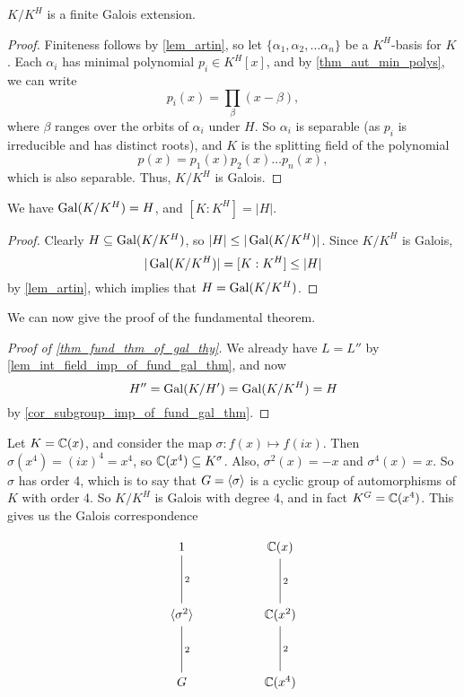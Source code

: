 \begin{corollary}
\label{cor_fixed_field_ext_is_gal}
    $K/K^H$ is a finite Galois extension.
\end{corollary}

\begin{proof}
    Finiteness follows by \cref{lem_artin}, so let $\{\alpha_1, \alpha_2, \ldots \alpha_n\}$ be a $K^H$-basis for $K$. Each $\alpha_i$ has minimal polynomial $p_i \in K^H[x]$, and by \cref{thm_aut_min_polys}, we can write
    \[
        p_i(x) = \prod_{\beta} (x - \beta),
    \]
    where $\beta$ ranges over the orbits of $\alpha_i$ under $H$. So $\alpha_i$ is separable (as $p_i$ is irreducible and has distinct roots), and $K$ is the splitting field of the polynomial
    \[
        p(x) = p_1(x) p_2(x) \ldots p_n(x),
    \]
    which is also separable. Thus, $K/K^H$ is Galois.
\end{proof}

\begin{corollary}
\label{cor_subgroup_imp_of_fund_gal_thm}
    We have $\operatorname{Gal}(K/K^H) = H$, and $[K : K^H] = |H|$.
\end{corollary}

\begin{proof}
    Clearly $H \subseteq \operatorname{Gal}(K/K^H)$, so $|H| \leq |\operatorname{Gal}(K/K^H)|$. Since $K/K^H$ is Galois,
    \[
        |\operatorname{Gal}(K/K^H)| = [K : K^H] \leq |H|
    \]
    by \cref{lem_artin}, which implies that $H = \operatorname{Gal}(K/K^H)$. 
\end{proof}

We can now give the proof of the fundamental theorem.

\begin{proof}[Proof of \cref{thm_fund_thm_of_gal_thy}]
    We already have $L = L''$ by \cref{lem_int_field_imp_of_fund_gal_thm}, and now
    \[
        H'' = \operatorname{Gal}(K/H') = \operatorname{Gal}(K/K^H) = H
    \]
    by \cref{cor_subgroup_imp_of_fund_gal_thm}.
\end{proof}

\begin{example}
    Let $K = \mathbb{{C}}(x)$, and consider the map $\sigma : f(x) \longmapsto f(ix)$. Then $\sigma(x^4) = (ix)^4 = x^4$, so $\mathbb{{C}}(x^4) \subseteq K^\sigma$. Also, $\sigma^2(x) = -x$ and $\sigma^4(x) = x$. So $\sigma$ has order 4, which is to say that $G = \langle {\sigma} \rangle$ is a cyclic group of automorphisms of $K$ with order 4. So $K/K^H$ is Galois with degree 4, and in fact $K^G = \mathbb{{C}}(x^4)$. This gives us the Galois correspondence
    \begin{figure}[h]
        \[
            \begin{tikzcd}
            	1 && {\mathbb{C}(x)} \\
            	\\
            	{\langle \sigma^2 \rangle} && {\mathbb{C}(x^2)} \\
            	\\
            	G && {\mathbb{C}(x^4)}
            	\arrow["2", no head, from=1-1, to=3-1]
            	\arrow["2", no head, from=3-1, to=5-1]
            	\arrow["2", no head, from=1-3, to=3-3]
            	\arrow["2", no head, from=3-3, to=5-3]
            \end{tikzcd}
        \]
    \end{figure}
\end{example}
